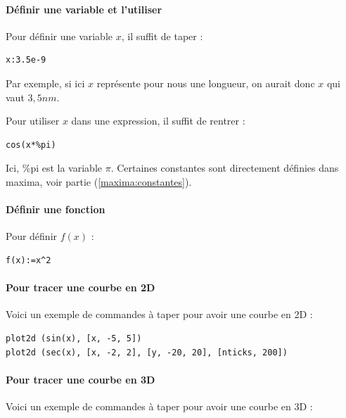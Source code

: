 \documentclass[a4paper,twoside]{article}
\begin{document}
\paragraph{Définir une variable et l'utiliser}

Pour définir une variable $x$, il suffit de taper :

\begin{verbatim}
x:3.5e-9
\end{verbatim}

\begin{remarque}
Par exemple, si ici $x$ représente pour nous une longueur, on aurait donc $x$ qui vaut $3,5\unit{nm}$.
\end{remarque}

Pour utiliser $x$ dans une expression, il suffit de rentrer :

\begin{verbatim}
cos(x*%pi)
\end{verbatim}

\begin{remarque}
Ici, \%pi est la variable $\pi$. Certaines constantes sont directement définies dans maxima, voir partie (\ref{maxima:constantes}).
\end{remarque}

\paragraph{Définir une fonction}
Pour définir $f(x)$ :
\begin{verbatim}
f(x):=x^2
\end{verbatim}


\paragraph{Pour tracer une courbe en 2D}

Voici un exemple de commandes à taper pour avoir une courbe en 2D :

\begin{verbatim}
plot2d (sin(x), [x, -5, 5])
plot2d (sec(x), [x, -2, 2], [y, -20, 20], [nticks, 200])
\end{verbatim}

\paragraph{Pour tracer une courbe en 3D}

Voici un exemple de commandes à taper pour avoir une courbe en 3D :
\end{document}
